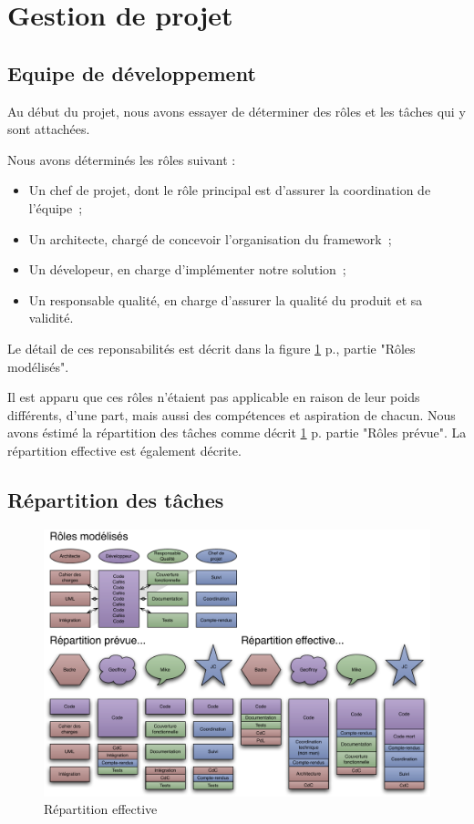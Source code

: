 \section{Gestion de projet}
\subsection{Equipe de développement}
Au début du projet, nous avons essayer de déterminer des rôles et les tâches qui y sont attachées.

Nous avons déterminés les rôles suivant :
\begin{itemize}
 \item Un chef de projet, dont le rôle principal est d'assurer la coordination de l'équipe~;
 \item Un architecte, chargé de concevoir l'organisation du framework~;
 \item Un dévelopeur, en charge d'implémenter notre solution~;
 \item Un responsable qualité, en charge d'assurer la qualité du produit et sa validité.
\end{itemize}
Le détail de ces reponsabilités est décrit dans la figure \ref{fig:repart_effect} p.\pageref{fig:repart_effect}, partie "Rôles modélisés".

Il est apparu que ces rôles n'étaient pas applicable en raison de leur poids différents, d'une part, mais aussi des compétences et aspiration de chacun. Nous avons éstimé la répartition des tâches comme décrit \ref{fig:repart_effect} p.\pageref{fig:repart_effect} partie "Rôles prévue".
La répartition effective est également décrite.

\subsection{Répartition des tâches}
\begin{figure}[thbp]
	\centering
		\includegraphics[angle=90, scale=0.7]{../diagrammes/repartition_taches.pdf}
	\caption{Répartition effective}
	\label{fig:repart_effect}
\end{figure}
